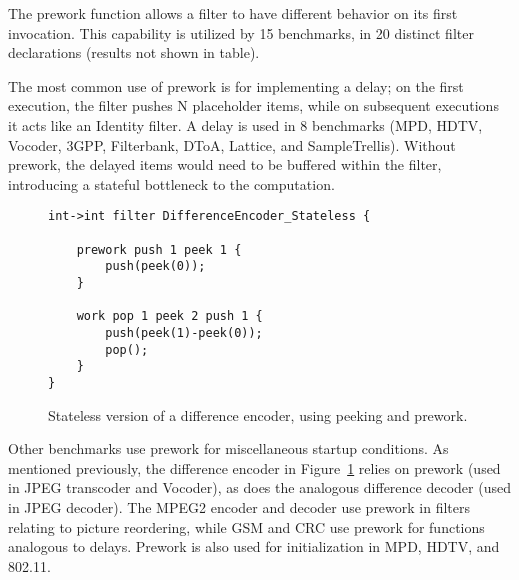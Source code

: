 \myitem{\startup} The prework function allows a filter to have
different behavior on its first invocation.  This capability is
utilized by 15 benchmarks, in 20 distinct filter declarations (results
not shown in table).
\label{sec:startup}

The most common use of prework is for implementing a delay; on the
first execution, the filter pushes N placeholder items, while on
subsequent executions it acts like an Identity filter.  A delay is
used in 8 benchmarks (MPD, HDTV, Vocoder, 3GPP, Filterbank, DToA,
Lattice, and SampleTrellis).  Without prework, the delayed items would
need to be buffered within the filter, introducing a stateful
bottleneck to the computation.

\begin{figure}[t!]
\vspace{-6pt}
\centering
\eightpoint
\begin{verbatim}
int->int filter DifferenceEncoder_Stateless {

    prework push 1 peek 1 {
        push(peek(0));
    }

    work pop 1 peek 2 push 1 {
        push(peek(1)-peek(0));
        pop();
    }
}
\end{verbatim}
\vspace{-10pt}
\caption{Stateless version of a difference encoder, using peeking
and prework.\protect\label{fig:diff-stateless}}
\end{figure}

Other benchmarks use prework for miscellaneous startup conditions.  As
mentioned previously, the difference encoder in
Figure~\ref{fig:diff-stateless} relies on prework (used in JPEG
transcoder and Vocoder), as does the analogous difference decoder
(used in JPEG decoder).  The MPEG2 encoder and decoder use prework in
filters relating to picture reordering, while GSM and CRC use prework
for functions analogous to delays.  Prework is also used for
initialization in MPD, HDTV, and 802.11.


